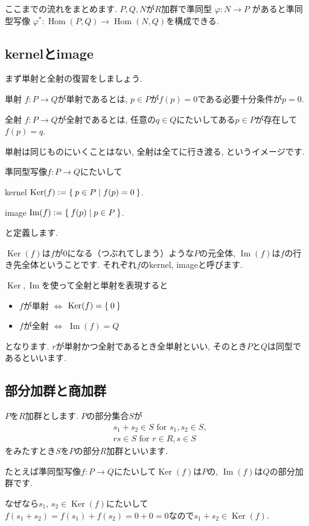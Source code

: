 \documentclass{jsarticle}
\newcommand{\makeop}[1]{\mathop{\mathrm{#1}}\nolimits}
\def\Im{\makeop{Im}}
\def\Ker{\makeop{Ker}}
\def\Hom{\makeop{Hom}}
\theoremstyle{definition}
\newcommand{\mydescription}[1]{
\begin{description}
\setlength{\itemindent}{2zw}
\setlength{\leftskip}{-2zw}
\setlength{\labelsep}{1zw}
#1
\end{description}
}
\numberwithin{theorem}{section}
\begin{document}
ここまでの流れをまとめます. $P, Q, N$が$R$加群で準同型 $\varphi: N \rightarrow P$ があると準同型写像
$\varphi^*: \Hom(P, Q) \rightarrow \Hom(N, Q)$を構成できる.

\subsection{kernelとimage}
まず単射と全射の復習をしましょう.
\mydescription{
\item[単射] $f: P \rightarrow Q$が単射であるとは, $p \in P$が$f(p) = 0$である必要十分条件が$p = 0$.
\item[全射] $f: P \rightarrow Q$が全射であるとは, 任意の$q\in Q$にたいしてある$p\in P$が存在して$f(p) = q$.
}
単射は同じものにいくことはない, 全射は全てに行き渡る, というイメージです.

準同型写像$f: P \rightarrow Q$にたいして
\mydescription{
\item[kernel] $\Ker(f) := \Set{p \in P | f(p) = 0}$.
\item[image] $\Im(f) := \Set{f(p) | p\in P}$.
}
と定義します.

$\Ker(f)$は$f$が0になる（つぶれてしまう）ような$P$の元全体, $\Im(f)$は$f$の行き先全体ということです.
それぞれ$f$のkernel, imageと呼びます.

$\Ker, \Im$を使って全射と単射を表現すると
\begin{itemize}
\item $f$が単射 $\Leftrightarrow$ $\Ker(f) = \Set{0}$
\item $f$が全射 $\Leftrightarrow$ $\Im(f) = Q$
\end{itemize}
となります. $r$が単射かつ全射であるとき全単射といい, そのとき$P$と$Q$は同型であるといいます.

\subsection{部分加群と商加群}
$P$を$R$加群とします. $P$の部分集合$S$が
\begin{align*}
& s_1 + s_2 \in S \text{ for } s_1, s_2 \in S,\\
& rs \in S \text{ for } r \in R, s \in S
\end{align*}
をみたすとき$S$を$P$の部分$R$加群といいます.

たとえば準同型写像$f:P \rightarrow Q$にたいして$\Ker(f)$は$P$の, $\Im(f)$は$Q$の部分加群です.

なぜなら$s_1$, $s_2 \in \Ker(f)$にたいして$f(s_1+s_2)=f(s_1)+f(s_2)=0+0=0$なので$s_1+s_2 \in \Ker(f)$.
\end{document}
